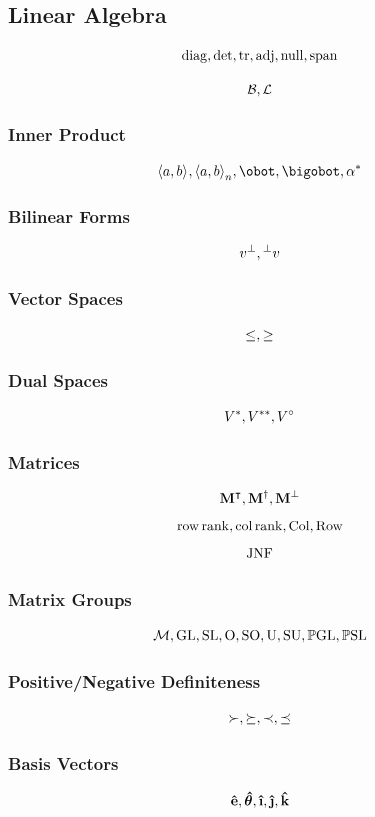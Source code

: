 \documentclass{article}
\begin{document}
\subsection{Linear Algebra}
\[
    \operatorname{diag}, \det, \tr, \operatorname{adj}, \operatorname{null}, \operatorname{span}
\]

\[
    \mathcal{B}, \mathcal{L}
\]

\subsubsection{Inner Product}
\[
    \inner{a}{b}, \inner[n]{a}{b}, \obot, \bigobot, \adjoint{\alpha}
\]

\subsubsection{Bilinear Forms}
\[
    v^{\perp}, \prescript{\perp}{}v
\]

\subsubsection{Vector Spaces}
\[
    \leq, \geq
\]

\subsubsection{Dual Spaces}
\[
    V^{\ast}, V^{\ast\ast}, V^{\circ}
\]

\subsubsection{Matrices}
\[
    \vb{M}^{\intercal}, \vb{M}^{\dagger}, \vb{M}^{\perp}
\]
\[
    \operatorname{row\,rank}, \operatorname{col\,rank}, \operatorname{Col}, \operatorname{Row}
\]
\[
    \operatorname{JNF}
\]  

\subsubsection{Matrix Groups}
\[
    \mathcal{M}, \operatorname{GL}, \operatorname{SL}, \operatorname{O}, \operatorname{SO}, \operatorname{U}, \operatorname{SU}, \mathbb{P}\mathrm{GL}, \mathbb{P}\mathrm{SL}
\]

\subsubsection{Positive/Negative Definiteness}
\[
    \succ, \succeq, \prec, \preceq
\]

\subsubsection{Basis Vectors}
\[
    \unitv{e}, \unitv*{\theta}, \ihat, \jhat, \khat
\]
\end{document}
